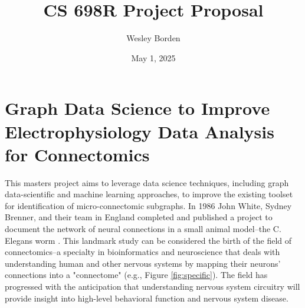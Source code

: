 \documentclass[11pt]{article}
\title{CS 698R Project Proposal}
\author{Wesley Borden}
\date{May 1, 2025}
\newcommand{\sectionwithindent}[1]{%
    \section*{#1}%
    \hspace{\parindent} %
}
\begin{document}

\sectionwithindent{Graph Data Science to Improve Electrophysiology Data Analysis for Connectomics}
This masters project aims to leverage data science techniques, including graph data-scientific and machine learning approaches, to improve the existing toolset for identification of micro-connectomic subgraphs. In 1986 John White, Sydney Brenner, and their team in England completed and published a project to document the network of neural connections in a small animal model--the C. Elegans worm \cite{white1986structure, emmons2015connectomics}. This landmark study can be considered the birth of the field of connectomics--a specialty in bioinformatics and neuroscience that deals with understanding human and other nervous systems by mapping their neurons' connections into a "connectome" (e.g., Figure \ref{fig:specific}). The field has progressed with the anticipation that understanding nervous system circuitry will provide insight into high-level behavioral function and nervous system disease.
\end{document}
